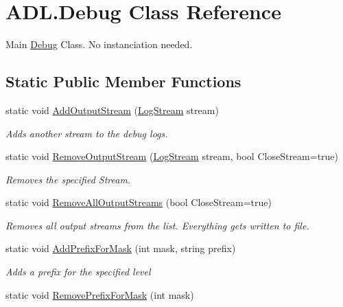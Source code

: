 \hypertarget{class_a_d_l_1_1_debug}{}\section{A\+D\+L.\+Debug Class Reference}
\label{class_a_d_l_1_1_debug}


Main \mbox{\hyperlink{class_a_d_l_1_1_debug}{Debug}} Class. No instanciation needed.  


\subsection*{Static Public Member Functions}
\begin{DoxyCompactItemize}
\item 
static void \mbox{\hyperlink{class_a_d_l_1_1_debug_a86b5d2f65724ee112ee9c911f9ce46ae}{Add\+Output\+Stream}} (\mbox{\hyperlink{class_a_d_l_1_1_log_stream}{Log\+Stream}} stream)
\begin{DoxyCompactList}\small\item\em Adds another stream to the debug logs. \end{DoxyCompactList}\item 
static void \mbox{\hyperlink{class_a_d_l_1_1_debug_a72625a03910e11ca410548f07ecf8e32}{Remove\+Output\+Stream}} (\mbox{\hyperlink{class_a_d_l_1_1_log_stream}{Log\+Stream}} stream, bool Close\+Stream=true)
\begin{DoxyCompactList}\small\item\em Removes the specified Stream. \end{DoxyCompactList}\item 
static void \mbox{\hyperlink{class_a_d_l_1_1_debug_adae2e77eb29191dc812b8875bd1ebd57}{Remove\+All\+Output\+Streams}} (bool Close\+Stream=true)
\begin{DoxyCompactList}\small\item\em Removes all output streams from the list. Everything gets written to file. \end{DoxyCompactList}\item 
static void \mbox{\hyperlink{class_a_d_l_1_1_debug_abec71a3a9db52f919e4ba93b6b9842e2}{Add\+Prefix\+For\+Mask}} (int mask, string prefix)
\begin{DoxyCompactList}\small\item\em Adds a prefix for the specified level \end{DoxyCompactList}\item 
static void \mbox{\hyperlink{class_a_d_l_1_1_debug_a779aa6ed8a563666beeea29b73058a99}{Remove\+Prefix\+For\+Mask}} (int mask)

\end{DoxyCompactItemize}
